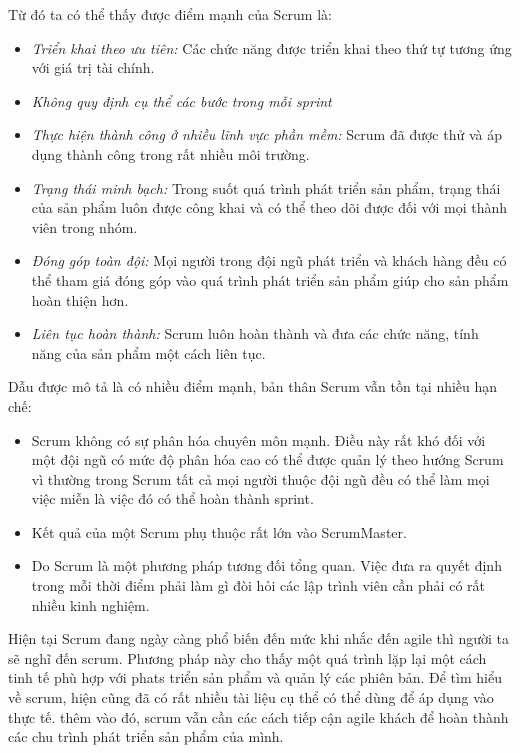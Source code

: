 \documentclass{article}
\begin{document}
	Từ đó ta có thể thấy được điểm mạnh của Scrum là:
	\begin{itemize}
		\item \textit{Triển khai theo ưu tiên:} Các chức năng được triển khai theo thứ tự tương ứng với giá trị tài chính.
		\item \textit{Không quy định cụ thể các bước trong mỗi sprint}
		\item \textit{Thực hiện thành công ở nhiều lĩnh vực phần mềm:} Scrum đã được thử và áp dụng thành công trong rất nhiều môi trường.
		
		\item \textit{Trạng thái minh bạch:} Trong suốt quá trình phát triển sản phẩm, trạng thái của sản phẩm luôn được công khai và có thể theo dõi được đối với mọi thành viên trong nhóm.
		
		\item \textit{Đóng góp toàn đội:} Mọi người trong đội ngũ phát triển và khách hàng đều có thể tham giá đóng góp vào quá trình phát triển sản phẩm giúp cho sản phẩm hoàn thiện hơn. 
		
		\item \textit{Liên tục hoàn thành:} Scrum luôn hoàn thành và đưa các chức năng, tính năng của sản phẩm một cách liên tục. 
		\end{itemize}

	Dẫu được mô tả là có nhiều điểm mạnh, bản thân Scrum vẫn tồn tại nhiều hạn chế:
	\begin{itemize}
		\item Scrum không có sự phân hóa chuyên môn mạnh. Điều này rất khó đối với một đội ngũ có mức độ phân hóa cao có thể được quản lý theo hướng Scrum vì thường trong Scrum tất cả mọi người thuộc đội ngũ đều có thể làm mọi việc miễn là việc đó có thể hoàn thành sprint. 
		
		\item Kết quả của một Scrum phụ thuộc rất lớn vào ScrumMaster.
		\item Do Scrum là một phương pháp tương đối tổng quan. Việc đưa ra quyết định trong mỗi thời điểm phải làm gì đòi hỏi các lập trình viên cần phải có rất nhiều kinh nghiệm. 
		\end{itemize}
		
	Hiện tại Scrum đang ngày càng phổ biến đến mức khi nhắc đến agile thì người ta sẽ nghĩ đến scrum. Phương pháp này cho thấy một quá trình lặp lại một cách tinh tế phù hợp với phats triển sản phẩm và quản lý các phiên bản. Để tìm hiểu về scrum, hiện cũng đã có rất nhiều tài liệu cụ thể có thể dùng để áp dụng vào thực tế. thêm vào đó, scrum vẫn cần các cách tiếp cận agile khách để hoàn thành các chu trình phát triển sản phẩm của mình.
	
\end{document}
